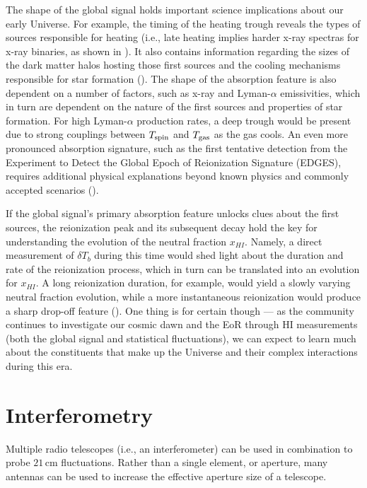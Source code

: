 The shape of the global signal holds important science implications about our early Universe. For example, the timing of the heating trough reveals the types of sources responsible for heating (i.e., late heating implies harder x-ray spectras for x-ray binaries, as shown in \citet{fialkov_et_al2014}). It also contains information regarding the sizes of the dark matter halos hosting those first sources and the cooling mechanisms responsible for star formation (\citealt{fialkov_et_al2014b}). The shape of the absorption feature is also dependent on a number of factors, such as x-ray and Lyman-$\alpha$ emissivities, which in turn are dependent on the nature of the first sources and properties of star formation. For high Lyman-$\alpha$ production rates, a deep trough would be present due to strong couplings between $T_{\rm spin}$ and $T_{\rm gas}$ as the gas cools. An even more pronounced absorption signature, such as the first tentative detection from the Experiment to Detect the Global Epoch of Reionization Signature (EDGES), requires additional physical explanations beyond known physics and commonly accepted scenarios (\citealt{bowman_et_al2018}). 

If the global signal's primary absorption feature unlocks clues about the first sources, the reionization peak and its subsequent decay hold the key for understanding the evolution of the neutral fraction $x_{HI}$. Namely, a direct measurement of $\delta T_{b}$ during this time would shed light about the duration and rate of the reionization process, which in turn can be translated into an evolution for $x_{HI}$. A long reionization duration, for example, would yield a slowly varying neutral fraction evolution, while a more instantaneous reionization would produce a sharp drop-off feature (\citealt{pritchard_and_loeb2010}). One thing is for certain though --- as the community continues to investigate our cosmic dawn and the EoR through HI measurements (both the global signal and statistical fluctuations), we can expect to learn much about the constituents that make up the Universe and their complex interactions during this era.

\section{Interferometry}
\label{sec:interferometry}

Multiple radio telescopes (i.e., an interferometer) can be used in combination to probe $21$\,cm fluctuations. Rather than a single element, or aperture, many antennas can be used to increase the effective aperture size of a telescope.

